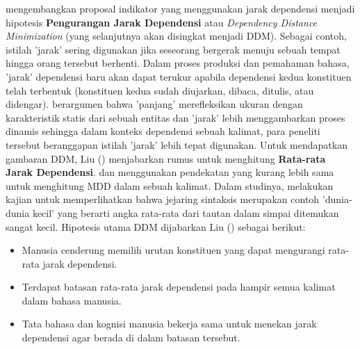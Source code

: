 \cite{liu2017dependency} mengembangkan proposal indikator yang menggunakan jarak dependensi menjadi hipotesis \textbf{Pengurangan Jarak Dependensi} atau \textit{Dependency Distance Minimization} (yang selanjutnya akan disingkat menjadi DDM). Sebagai contoh, istilah 'jarak' sering digunakan jika seseorang bergerak menuju sebuah tempat hingga orang tersebut berhenti. Dalam proses produksi dan pemahaman bahasa, 'jarak' dependensi baru akan dapat terukur apabila dependensi kedua konstituen telah terbentuk (konstituen kedua sudah diujarkan, dibaca, ditulis, atau didengar). \cite{liu2017dependency} berargumen bahwa 'panjang' merefleksikan ukuran dengan karakteristik statis dari sebuah entitas dan 'jarak' lebih menggambarkan proses dinamis sehingga dalam konteks dependensi sebuah kalimat, para peneliti tersebut beranggapan istilah 'jarak' lebih tepat digunakan. Untuk mendapatkan gambaran DDM, Liu (\citealp{liu2008dependency, liu2017dependency}) menjabarkan rumus untuk menghitung \textbf{Rata-rata Jarak Dependensi}. \cite{hudson2010introduction} dan \cite{i2004euclidean} menggunakan pendekatan yang kurang lebih sama untuk menghitung MDD dalam sebuah kalimat. Dalam studinya, \cite{i2004patterns} melakukan kajian untuk memperlihatkan bahwa jejaring sintaksis merupakan contoh 'dunia-dunia kecil' yang berarti angka rata-rata dari tautan dalam simpai ditemukan sangat kecil. Hipotesis utama DDM dijabarkan Liu (\citealp{liu2008dependency, liu2017dependency}) sebagai berikut:

\begin{itemize}
\item Manusia cenderung memilih urutan konstituen yang dapat mengurangi rata-rata jarak dependensi.
\item Terdapat batasan rata-rata jarak dependensi pada hampir semua kalimat dalam bahasa manusia.
\item Tata bahasa dan kognisi manusia bekerja sama untuk menekan jarak dependensi agar berada di dalam batasan tersebut.
\end{itemize}

